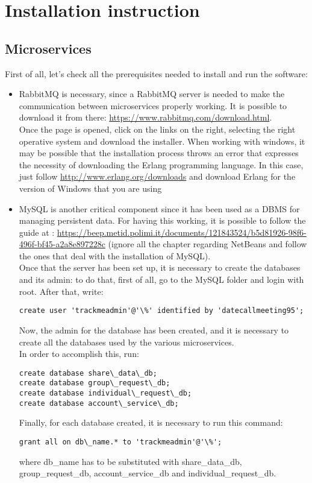 \section{Installation instruction}
\subsection{Microservices}
First of all, let's check all the prerequisites needed to install and run the software:

\begin{itemize}

\item RabbitMQ is necessary, since a RabbitMQ server is needed to make the communication between microservices properly working.
It is possible to download it from there: \url{https://www.rabbitmq.com/download.html}. \\
Once the page is opened, click on the links on the right, selecting the right operative system and download the installer. 
When working with windows, it may be possible that the installation process throws an error that expresses the necessity of downloading
the Erlang programming language. In this case, just follow \url{http://www.erlang.org/downloads} and download Erlang for the version
of Windows that you are using

\item MySQL is another critical component since it has been used as a DBMS for managing persistent data. For having this working, it
is possible to follow the guide at : \url{https://beep.metid.polimi.it/documents/121843524/b5d81926-98f6-496f-bf45-a2a8e897228c} 
(ignore all the chapter regarding NetBeans and follow the ones that deal with the installation of MySQL). \\
Once that the server has been set up, it is necessary to create the databases and its admin: to do that, first of all, go to the MySQL 
folder and login with root. After that, write: 
\begin{verbatim}
create user 'trackmeadmin'@'\%' identified by 'datecallmeeting95';
\end{verbatim}
Now, the admin for the database has been created, and it is necessary to create all the databases used by the various microservices. \\
In order to accomplish this, run:
\begin{verbatim}
create database share\_data\_db;
create database group\_request\_db; 
create database individual\_request\_db;
create database account\_service\_db;
\end{verbatim}
Finally, for each database created, it is necessary to run this command: 
\begin{verbatim}
grant all on db\_name.* to 'trackmeadmin'@'\%';
\end{verbatim}
where db\_name has to be substituted with share\_data\_db, group\_request\_db, account\_service\_db and individual\_request\_db. 

\end{itemize}

